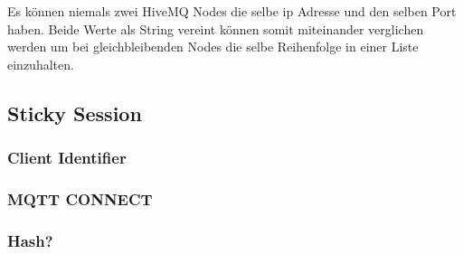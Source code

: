 Es können niemals zwei HiveMQ Nodes die selbe \ac{ip} Adresse und den selben Port haben. Beide Werte als String vereint können somit miteinander verglichen werden um bei gleichbleibenden Nodes die selbe Reihenfolge in einer Liste einzuhalten.

\subsection{Sticky Session}
\subsubsection{Client Identifier}
\subsubsection{MQTT CONNECT}

\subsubsection{Hash?}

\begin{comment}
- This is supposed to be the core of your thesis or project. Describe your work from a con-ceptual viewpoint.
- Example: In case you have developed some prototypical tool in your bachelor thesis, demonstrate how it is employed in its business context. More concrete example: Assume that your contribution is a Maven-Build-Plugin that further automates the deployment of changes to the claim handling process into production. In this case show how the plugin is integrated in the overall (continuous) integration and deployment process, which human ac-tors are involved, which external systems and so on. Elaborate on subtle edge cases you had to deal with, e.g., possible outages of external systems.
- Usedi  agramswhere appropriate. Standard notations are better than informal box-and-line-diagrams. Typical standard notations for a solution concept are
  - Business Process Modelling Notation (BPMN) or UML activity diagrams, that depict a workflow in which your tool is used
  - UML component diagrams, where your tool is represented by just a single component (without its ingredients) together with connected external systems
\end{comment}
